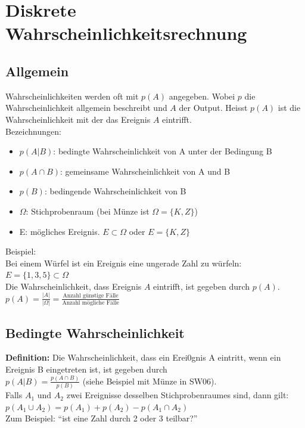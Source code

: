 \documentclass[12pt]{scrartcl}
\begin{document}
\newpage
\section{Diskrete Wahrscheinlichkeitsrechnung}
\subsection{Allgemein}

Wahrscheinlichkeiten werden oft mit $p(A)$ angegeben. Wobei $p$ die Wahrscheinlichkeit allgemein
beschreibt und $A$ der Output. Heisst $p(A)$ ist die Wahrscheinlichkeit mit der das Ereignis $A$ 
eintrifft.\\

Bezeichnungen:
\begin{itemize}
    \item $p(A|B)$: bedingte Wahrscheinlichkeit von A unter der Bedingung B
    \item $p(A \cap B)$: gemeinsame Wahrscheinlichkeit von A und B
    \item $p(B)$: bedingende Wahrscheinlichkeit von B
    \item $\Omega$: Stichprobenraum (bei Münze ist $\Omega = \{K, Z\}$)
    \item E: mögliches Ereignis. $E \subset \Omega$ oder $E = \{K, Z\}$
\end{itemize}

Beispiel:\\
Bei einem Würfel ist ein Ereignis eine ungerade Zahl zu würfeln: $E = \{1, 3, 5\} \subset \Omega$\\

Die Wahrscheinlichkeit, dass Ereignis $A$ eintrifft, ist gegeben durch $p(A)$.\\
$\displaystyle{p(A) = \frac{\vert A \vert}{\vert \Omega \vert} = \frac{\text{Anzahl günstige Fälle}}{\text{Anzahl mögliche Fälle}}}$\\


\subsection{Bedingte Wahrscheinlichkeit}
\textbf{Definition:} Die Wahrscheinlichkeit, dass ein Erei0gnis A eintritt, wenn ein Ereignis B eingetreten ist, ist gegeben durch\\
$p(A|B) = \frac{p(A \cap B)}{p(B)}$ (siehe Beispiel mit Münze in SW06). \\

Falls $A_1$ und $A_2$ zwei Ereignisse desselben Stichprobenraumes sind, dann gilt:\\
$p(A_1 \cup A_2) = p(A_1) + p(A_2) - p(A_1 \cap A_2)$\\
Zum Beispiel: ``ist eine Zahl durch 2 oder 3 teilbar?''\\
\end{document}
